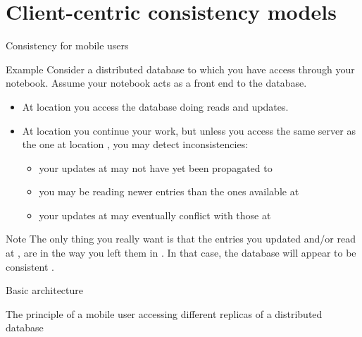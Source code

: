 \section{Client-centric consistency models}
\begin{slide}{Consistency for mobile users}
  \begin{exampleblock}{Example}
    Consider a distributed database to which you have access through your notebook. Assume your notebook acts
    as a front end to the database.
    \begin{itemize}
    \item At location  you access the database doing reads and updates.
    \item At location  you continue your work, but unless you access the same server as the one at location
      , you may detect inconsistencies:
      \begin{itemize}\tightlist
      \item your updates at  may not have yet been propagated to 
      \item you may be reading newer entries than the ones available at 
      \item your updates at  may eventually conflict with those at 
      \end{itemize}
    \end{itemize}
  \end{exampleblock}
  \onslide
  \begin{alertblock}{Note}
    The only thing you really want is that the entries you updated and/or read at , are in  the
    way you left them in . In that case, the database will appear to be consistent .
  \end{alertblock}
\end{slide}
\begin{slide}{Basic architecture}
  \begin{block}{The principle of a mobile user accessing different replicas of a distributed database}
    \begin{centerfig}
    \end{centerfig}
  \end{block}
\end{slide}
